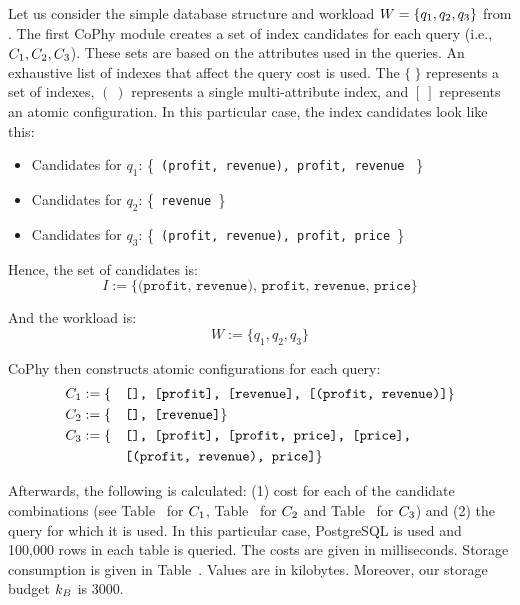 \begin{example}
Let us consider the simple database structure and workload $W = \{q_1, q_2, q_3\}$ from . The first CoPhy module creates a set of index candidates for each query (i.e., $C_1, C_2, C_3$). These sets are based on the attributes used in the queries. An exhaustive list of indexes that affect the query cost is used. The $\{ \ \}$ represents a set of indexes, $( \ )$ represents a single multi-attribute index, and $[ \ ]$ represents an atomic configuration. In this particular case, the index candidates look like this:
\begin{itemize} 
    \item Candidates for $q_1$: \{\texttt{ (profit, revenue), profit, revenue } \}
    \item Candidates for $q_2$: \{\texttt{ revenue }\}
    \item Candidates for $q_3$: \{\texttt{ (profit, revenue), profit, price }\}
\end{itemize}

Hence, the set of candidates is:
$$
I := \{ \texttt{(profit, revenue), profit, revenue, price} \}
$$

And the workload is:
$$
W := \{ q_1, q_2, q_3 \}
$$

CoPhy then constructs atomic configurations for each query:
\begin{alignat*}{2}
    C_1 &:= \{&&\texttt{[], [profit], [revenue], [(profit, revenue)]}\} \\
    C_2 &:= \{&&\texttt{[], [revenue]}\} \\
    C_3 &:= \{&&\texttt{[], [profit], [profit, price], [price],} \\
    	& &&\texttt{[(profit, revenue), price]} \}
\end{alignat*}


Afterwards, the following is calculated: (1) cost for each of the candidate combinations (see Table~ for $C_1$, Table~ for $C_2$ and Table~ for $C_3$) and (2) the query for which it is used. In this particular case, PostgreSQL is used and 100,000 rows in each table is queried. The costs are given in milliseconds. Storage consumption is given in Table~. Values are in kilobytes. Moreover, our storage budget $k_B$ is 3000.


\end{example}
